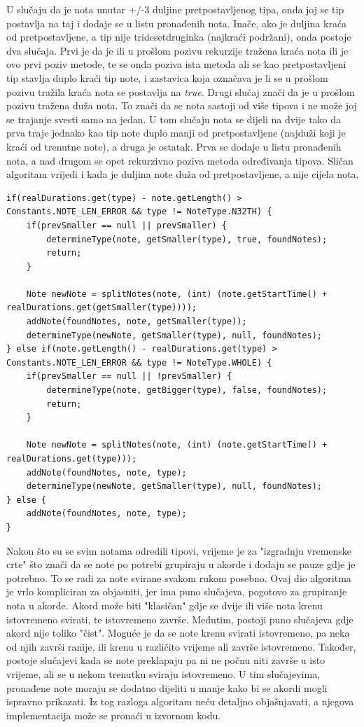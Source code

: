 \documentclass[times, utf8, zavrsni, numeric]{fer}
\begin{document}
U slučaju da je nota unutar +/-3 duljine pretpostavljenog tipa, onda joj se tip postavlja na taj i dodaje se u listu pronađenih nota. Inače, ako je duljina kraća od pretpostavljene, a tip nije tridesetdruginka (najkraći podržani), onda postoje dva slučaja. Prvi je da je ili u prošlom pozivu rekurzije tražena kraća nota ili je ovo prvi poziv metode, te se onda poziva ista metoda ali se kao pretpostavljeni tip stavlja duplo kraći tip note, i zastavica koja označava je li se u prošlom pozivu tražila kraća nota se postavlja na \textit{true}. Drugi slučaj znači da je u prošlom pozivu tražena duža nota. To znači da se nota sastoji od više tipova i ne može joj se trajanje svesti samo na jedan. U tom slučaju nota se dijeli na dvije tako da prva traje jednako kao tip note duplo manji od pretpostavljene (najduži koji je kraći od trenutne note), a druga je ostatak. Prva se dodaje u listu pronađenih nota, a nad drugom se opet rekurzivno poziva metoda određivanja tipova. Sličan algoritam vrijedi i kada je duljina note duža od pretpostavljene, a nije cijela nota.

\begin{lstlisting}
if(realDurations.get(type) - note.getLength() > Constants.NOTE_LEN_ERROR && type != NoteType.N32TH) {
	if(prevSmaller == null || prevSmaller) {
		determineType(note, getSmaller(type), true, foundNotes);
		return;
	}
	
	Note newNote = splitNotes(note, (int) (note.getStartTime() + realDurations.get(getSmaller(type))));
	addNote(foundNotes, note, getSmaller(type));
	determineType(newNote, getSmaller(type), null, foundNotes);
} else if(note.getLength() - realDurations.get(type) > Constants.NOTE_LEN_ERROR && type != NoteType.WHOLE) {
	if(prevSmaller == null || !prevSmaller) {
		determineType(note, getBigger(type), false, foundNotes);
		return;
	}
	
	Note newNote = splitNotes(note, (int) (note.getStartTime() + realDurations.get(type)));
	addNote(foundNotes, note, type);
	determineType(newNote, getSmaller(type), null, foundNotes);
} else {
	addNote(foundNotes, note, type);
}
\end{lstlisting}

Nakon što su se svim notama odredili tipovi, vrijeme je za "izgradnju vremenske crte" što znači da se note po potrebi grupiraju u akorde i dodaju se pauze gdje je potrebno. To se radi za note svirane svakom rukom posebno. Ovaj dio algoritma je vrlo kompliciran za objasniti, jer ima puno slučajeva, pogotovo za grupiranje nota u akorde. Akord može biti "klasičan" gdje se dvije ili više nota krenu istovremeno svirati, te istovremeno završe. Međutim, postoji puno slučajeva gdje akord nije toliko "čist". Moguće je da se note krenu svirati istovremeno, pa neka od njih završi ranije, ili krenu u različito vrijeme ali završe istovremeno. Također, postoje slučajevi kada se note preklapaju pa ni ne počnu niti završe u isto vrijeme, ali se u nekom trenutku sviraju istovremeno. U tim slučajevima, pronađene note moraju se dodatno dijeliti u manje kako bi se akordi mogli ispravno prikazati. Iz tog razloga algoritam neću detaljno objašnjavati, a njegova implementacija može se pronaći u izvornom kodu.\\
\end{document}

